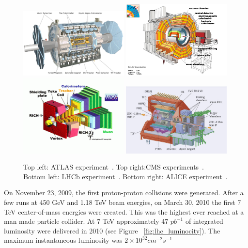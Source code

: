 \begin{figure}[htb]
\centering
\includegraphics[width=0.49\textwidth]{Experiment/atlas.jpg}
\includegraphics[width=0.49\textwidth]{Experiment/cms.jpg}
\includegraphics[width=0.49\textwidth]{Experiment/LHCb.png}
\includegraphics[width=0.49\textwidth]{Experiment/alice.jpg}
\caption{Top left: ATLAS experiment~\cite{ATLAS_image}. Top right:CMS experiments~\cite{CMS_image}. Bottom left: LHCb experiment~\cite{lhcb_image}. Bottom right: ALICE experiment~\cite{ALICE_image}.}
\label{fig:lhc_experiments}
\end{figure}




On November 23, 2009, the first proton-proton collisions were generated.  After a few runs at 450 GeV and 1.18 TeV beam energies, on March 30, 2010 the first 7 TeV center-of-mass energies were created.  This was the highest ever reached at a man made particle collider.  At 7 TeV approximately 47 $pb^{-1}$ of integrated luminosity were delivered in 2010 (see Figure ~\ref{fig:lhc_luminocity}). The maximum instantaneous luminosity was $2 \times 10^{32} cm^{-2}s^{-1} $

